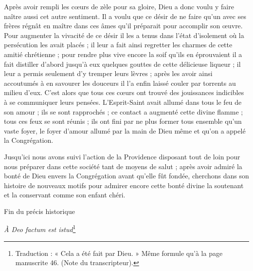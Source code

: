 Après avoir rempli les cœurs de zèle pour sa gloire, Dieu a donc voulu y faire naître aussi cet autre sentiment. Il a voulu que ce désir de ne faire qu'un avec ses frères régnât en maître dans ces âmes qu'il préparait pour accomplir son œuvre. Pour augmenter la vivacité de ce désir il les a tenus dans l'état d'isolement où la persécution les avait placés ; il leur a fait ainsi regretter les charmes de cette amitié chrétienne ; pour rendre plus vive encore la soif qu'ils en éprouvaient il a fait distiller d'abord jusqu'à eux quelques gouttes de cette délicieuse liqueur ; il leur a permis seulement d'y tremper leurs lèvres ; après les avoir ainsi accoutumés à en savourer les douceurs il l'a enfin laissé couler par torrents au milieu d'eux. C'est alors que tous ces cœurs ont trouvé des jouissances indicibles à se communiquer leurs pensées. L'Esprit-Saint avait allumé dans tous le feu de son amour ; ils se sont rapprochés ; ce contact a augmenté cette divine flamme ; tous ces feux se sont réunis ; ils ont fini par ne plus former tous ensemble qu'un vaste foyer, le foyer d'amour allumé par la main de Dieu même et qu'on a appelé la Congrégation.

Jusqu'ici nous avons suivi l'action de la Providence
disposant tout de loin pour nous préparer dans cette société tant de moyens de salut ; après avoir admiré la bonté de Dieu envers la Congrégation avant qu'elle fût fondée, cherchons dans son histoire de nouveaux motifs pour admirer encore cette bonté divine la soutenant et la conservant comme son enfant chéri.

\begin{center}
Fin du précis historique

\textit{À Deo factum est istud}\footnote{Traduction : « Cela a été fait par Dieu. » Même formule qu’à la page manuscrite 46. (Note du transcripteur).}
\end{center}
